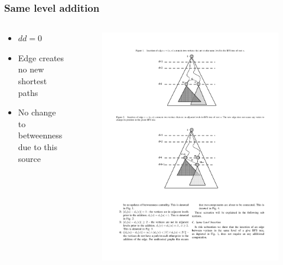 \begin{frame}
  \frametitle{Same level addition}
  \begin{columns}[onlytextwidth]

    \begin{column}{0.5\textwidth}
      \begin{itemize}
        \item $dd = 0$
        \item Edge creates no new shortest paths
        \item No change to betweenness \\ due to this source
      \end{itemize}
    \end{column}

    \begin{column}{0.5\textwidth}
      \begin{figure}[t]
        \centering
        \includegraphics[width=\textwidth, height=\textheight, keepaspectratio]{imgs/green-0lvl-compressed}
      \end{figure}
    \end{column}
  \end{columns}

\end{frame}


